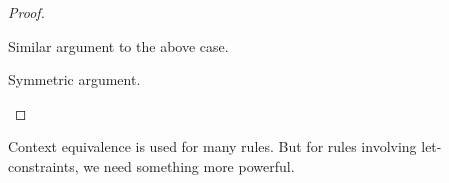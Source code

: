 \documentclass[acmsmall,screen,nonacm,review]{acmart}
\begin{document}
\begin{lemma}
\begin{proof}
\begin{itemize}
\begin{itemize}
\begin{itemize}

	      \begin{llproof}
		Similar argument to the above case.
	      \end{llproof}
	  \end{itemize}


	  \proofcase{$\impliedby$}

	  \begin{llproof}
	    Symmetric argument.
	  \end{llproof}
	\end{itemize}
    \end{itemize}
  \end{proof}
\end{lemma}

Context equivalence is used for many rules. But for rules involving let-constraints,
we need something more powerful.
\end{document}
